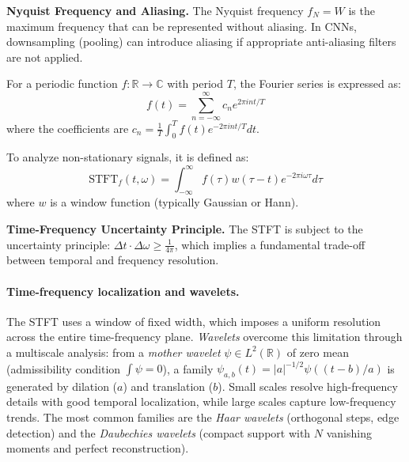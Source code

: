 \textbf{Nyquist Frequency and Aliasing.} The Nyquist frequency $f_N = W$ is the maximum frequency that can be represented without aliasing. In CNNs, downsampling (pooling) can introduce aliasing if appropriate anti-aliasing filters are not applied.

\begin{definition}\label{def:serie_fourier}
For a periodic function $f: \mathbb{R} \to \mathbb{C}$ with period $T$, the Fourier series is expressed as:
\begin{equation}
f(t) = \sum_{n=-\infty}^{\infty} c_n e^{2\pi i n t/T}
\end{equation}
where the coefficients are $c_n = \frac{1}{T} \int_0^T f(t) e^{-2\pi i n t/T} dt$.
\end{definition}

\begin{definition}\label{def:stft}
To analyze non-stationary signals, it is defined as:
\begin{equation}
\text{STFT}_f(t, \omega) = \int_{-\infty}^{\infty} f(\tau) w(\tau - t) e^{-2\pi i \omega \tau} d\tau
\end{equation}
where $w$ is a window function (typically Gaussian or Hann).
\end{definition}

\textbf{Time-Frequency Uncertainty Principle.} The STFT is subject to the uncertainty principle: $\Delta t \cdot \Delta \omega \geq \frac{1}{4\pi}$, which implies a fundamental trade-off between temporal and frequency resolution.

\paragraph{Time-frequency localization and wavelets.} The STFT uses a window of fixed width, which imposes a uniform resolution across the entire time-frequency plane. \textit{Wavelets} overcome this limitation through a multiscale analysis: from a \textit{mother wavelet} $\psi \in L^2(\mathbb{R})$ of zero mean (admissibility condition $\int \psi = 0$), a family $\psi_{a,b}(t) = |a|^{-1/2}\psi((t-b)/a)$ is generated by dilation ($a$) and translation ($b$). Small scales resolve high-frequency details with good temporal localization, while large scales capture low-frequency trends. The most common families are the \textit{Haar wavelets} (orthogonal steps, edge detection) and the \textit{Daubechies wavelets} (compact support with $N$ vanishing moments and perfect reconstruction).

